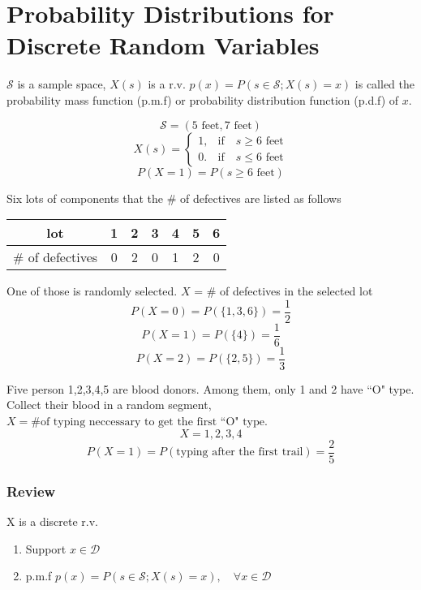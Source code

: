 \section{Probability Distributions for Discrete Random Variables}

\begin{defn}

$\mathcal{S}$ is a sample space, $X(s)$ is a r.v. $p(x)=P(s\in \mathcal{S};X(s)= x) $ is called the probability mass function (p.m.f) or probability distribution function (p.d.f) of $x$.
\end{defn}

\begin{exmp}
\[	\mathcal{S}=(5 \text{ feet}, 7 \text{ feet} )		\]
\[	X(s)=\begin{cases}
1, & \text{if} \quad s\geq 6 \text{ feet} \\
0. & \text{if} \quad s\leq 6 \text{ feet}
\end{cases}		\]
\[	P(X=1)=P(s \geq 6 \text{ feet})\]
\end{exmp}

\begin{exmp}
Six lots of components that the \# of defectives are listed as follows
\begin{center}
\begin{tabular}{c|cccccc}
\hline
lot				& 1 & 2 & 3 & 4 & 5 & 6 \\
\hline
\# of defectives& 0 & 2 & 0 & 1 & 2 & 0 \\
\hline
\end{tabular}
\end{center}

One of those is randomly selected. $X$ = \# of defectives in the selected lot
\[	P(X=0)=P(\{1,3,6\})=\frac{1}{2}		\]
\[	P(X=1)=P(\{4\})=\frac{1}{6}			\]
\[	P(X=2)=P(\{2,5\})=\frac{1}{3}		\]
\end{exmp}

\begin{exmp}
Five person 1,2,3,4,5 are blood donors. Among them, only 1 and 2 have ``O" type. Collect their blood in a random segment, $X=\text{\# of typing neccessary to get the first ``O" type}$.
\[	X = 1,2,3,4		\]
\[	P(X=1)=P(\text{typing after the first trail})=\frac{2}{5} \]
\end{exmp}

\subsubsection{Review}
X is a discrete r.v.
\begin{enumerate}
\item Support $x \in \mathcal{D}$
\item p.m.f $p(x)=P(s\in \mathcal{S};X(s)= x), \quad\forall x \in \mathcal{D}$
\end{enumerate}


